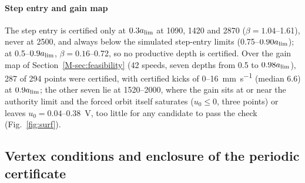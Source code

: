 \paragraph{Step entry and gain map} The step entry is certified only at $0.3a_{\lim}$ at 1090, 1420 and \SI{2870}{\rpm} ($\beta=1.04$--1.61), never at \SI{2500}{\rpm}, and always below the simulated step-entry limits (0.75--$0.90a_{\lim}$); at 0.5--$0.9a_{\lim}$, $\beta=0.16$--0.72, so no productive depth is certified. Over the gain map of Section~\ref{M-sec:feasibility} (42 speeds, seven depths from 0.5 to $0.98a_{\lim}$), 287 of 294 points were certified, with certified kicks of 0--\SI{16}{\milli\metre\per\second} (median 6.6) at $0.9a_{\lim}$; the other seven lie at 1520--\SI{2000}{\rpm}, where the gain sits at or near the authority limit and the forced orbit itself saturates ($u_0\le0$, three points) or leaves $u_0=0.04$--\SI{0.38}{\volt}, too little for any candidate to pass the check (Fig.~\ref{fig:surf}).

\subsection{Vertex conditions and enclosure of the periodic certificate}\label{supp:cert-vertex}

